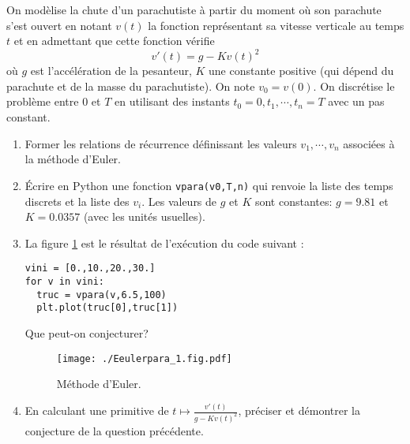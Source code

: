 On modèlise la chute d'un parachutiste à partir du moment où son parachute s'est ouvert en notant $v(t)$ la fonction représentant sa vitesse verticale au temps $t$ et en admettant que cette fonction vérifie
\begin{displaymath}
  v'(t) = g - K v(t)^2
\end{displaymath}
où $g$ est l'accélération de la pesanteur, $K$ une constante positive (qui dépend du parachute et de la masse du parachutiste). On note $v_0=v(0)$.\newline
On discrétise le problème entre $0$ et $T$ en utilisant des instants $t_0=0,t_1,\cdots,t_n=T$ avec un pas constant.

\begin{enumerate}
  \item Former les relations de récurrence définissant les valeurs $v_1,\cdots,v_n$ associées à la méthode d'Euler.
  \item \'Ecrire en Python une fonction \texttt{vpara(v0,T,n)} qui renvoie la liste des temps discrets et la liste des $v_i$. Les valeurs de $g$ et $K$ sont constantes: $g=9.81$ et $K= 0.0357$ (avec les unités usuelles).
  \item La figure \ref{fig:Eeulerpara_1} est le résultat de l'exécution du code suivant :
\begin{verbatim}
vini = [0.,10.,20.,30.]
for v in vini:    
  truc = vpara(v,6.5,100)
  plt.plot(truc[0],truc[1])  
\end{verbatim}
Que peut-on conjecturer?
\begin{figure}[h]
  \centering
  \texttt{[image: ./Eeulerpara\_1.fig.pdf]}
  \caption{Méthode d'Euler.}
  \label{fig:Eeulerpara_1}
\end{figure}

  \item En calculant une primitive de $t\mapsto \frac{v'(t)}{g-Kv(t)^2}$, préciser et démontrer la conjecture de la question précédente.
\end{enumerate}

